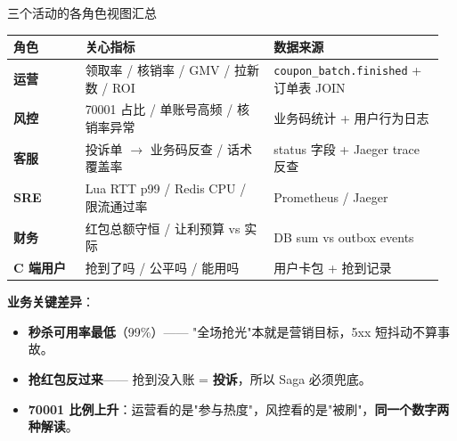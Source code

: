 \documentclass[aspectratio=169,11pt]{beamer}
\begin{document}
\begin{frame}[shrink]{三个活动的各角色视图汇总}
\scriptsize
\begin{tabular}{@{}p{0.16\linewidth}p{0.42\linewidth}p{0.38\linewidth}@{}}
\toprule
角色  & 关心指标 & 数据来源 \\
\midrule
\textbf{运营}     & 领取率 / 核销率 / GMV / 拉新数 / ROI & \texttt{coupon\_batch.finished} + 订单表 JOIN \\
\textbf{风控}     & 70001 占比 / 单账号高频 / 核销率异常 & 业务码统计 + 用户行为日志 \\
\textbf{客服}     & 投诉单 $\to$ 业务码反查 / 话术覆盖率 & status 字段 + Jaeger trace 反查 \\
\textbf{SRE}      & Lua RTT p99 / Redis CPU / 限流通过率 & Prometheus / Jaeger \\
\textbf{财务}     & 红包总额守恒 / 让利预算 vs 实际 & DB sum vs outbox events \\
\textbf{C 端用户} & 抢到了吗 / 公平吗 / 能用吗 & 用户卡包 + 抢到记录 \\
\bottomrule
\end{tabular}
\smallskip

\footnotesize\textbf{业务关键差异}：
\begin{itemize}\itemsep0pt
  \item \textbf{秒杀可用率最低}（99\%）—— "全场抢光"本就是营销目标，5xx 短抖动不算事故。
  \item \textbf{抢红包反过来}—— 抢到没入账 = \textbf{投诉}，所以 Saga 必须兜底。
  \item \textbf{70001 比例上升}：运营看的是"参与热度"，风控看的是"被刷"，\textbf{同一个数字两种解读}。
\end{itemize}
\end{frame}
\end{document}

